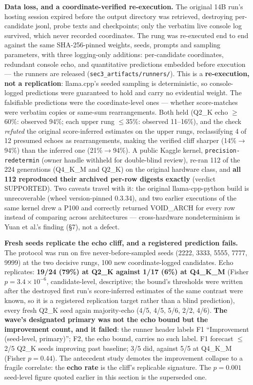 \textbf{Data loss, and a coordinate-verified re-execution.} The original 14B run's hosting session expired before the output directory was retrieved, destroying per-candidate jsonl, probe texts and checkpoints; only the verbatim live console log survived, which never recorded coordinates. The rung was re-executed end to end against the same SHA-256-pinned weights, seeds, prompts and sampling parameters, with three logging-only additions: per-candidate coordinates, redundant console echo, and quantitative predictions embedded before execution --- the runners are released (\texttt{sec3\_artifacts/runners/}). This is a \textbf{re-execution, not a replication}: llama.cpp's seeded sampling is deterministic, so console-logged predictions were guaranteed to hold and carry no evidential weight. The falsifiable predictions were the coordinate-level ones --- whether score-matches were verbatim copies or same-sum rearrangements. Both held (Q2\_K echo $\ge$60\%: observed 94\%; each upper rung $\le$35\%: observed 11--16\%), and the check \emph{refuted} the original score-inferred estimates on the upper rungs, reclassifying 4 of 12 presumed echoes as rearrangements, making the verified cliff sharper (14\%$\to$94\%) than the inferred one (21\%$\to$94\%). A public Kaggle kernel, \texttt{precision-redetermin} (owner handle withheld for double-blind review), re-ran 112 of the 224 generations (Q4\_K\_M and Q2\_K) on the original hardware class, and \textbf{all 112 reproduced their archived per-row digests exactly} (verdict SUPPORTED). Two caveats travel with it: the original llama-cpp-python build is unrecoverable (wheel version-pinned 0.3.34), and two earlier executions of the same kernel drew a P100 and correctly returned VOID\_ARCH for every row instead of comparing across architectures --- cross-hardware nondeterminism is Yuan et al.'s finding (\S7), not a defect.

\textbf{Fresh seeds replicate the echo cliff, and a registered prediction fails.} The protocol was run on five never-before-sampled seeds (2222, 3333, 5555, 7777, 9999) at the two decisive rungs, 100 new coordinate-logged candidates. Echo replicates: \textbf{19/24 (79\%) at Q2\_K against 1/17 (6\%) at Q4\_K\_M} (Fisher $p = 3.4\times10^{-6}$, candidate-level, descriptive; the bound's thresholds were written after the destroyed first run's score-inferred estimates of the same contrast were known, so it is a registered replication target rather than a blind prediction), every fresh Q2\_K seed again majority-echo (4/5, 4/5, 5/6, 2/2, 4/6). \textbf{The wave's designated primary was not the echo bound but the improvement count, and it failed}: the runner header labels F1 ``Improvement (seed-level, primary)''; F2, the echo bound, carries no such label. F1 forecast $\le$2/5 Q2\_K seeds improving past baseline; 3/5 did, against 5/5 at Q4\_K\_M (Fisher $p = 0.44$). The antecedent study demotes the improvement collapse to a fragile correlate: the \textbf{echo rate} is the cliff's replicable signature. The $p = 0.001$ seed-level figure quoted earlier in this section is the superseded one.


